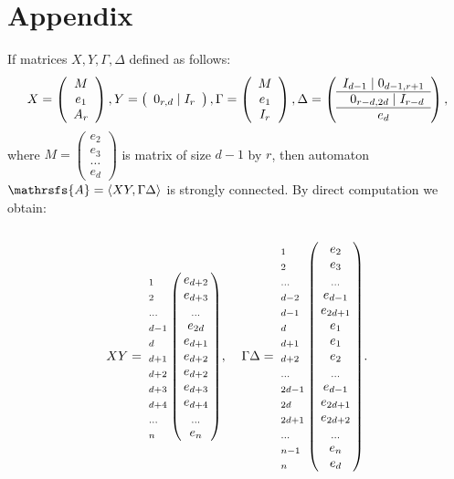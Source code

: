 \documentclass[11pt]{llncs}
\newcommand{\A}{\mathrsfs{A}}
\newcommand{\G}{\Gamma}
\newcommand{\D}{\Delta}
\begin{document}
\section*{Appendix}
If matrices $X,Y,\G,\D$ defined as follows:
$$
X =
\left(
\begin{array}{c}
M \\
e_1 \\
A_r
\end{array}
\right),
Y =
\left(
\begin{array}{c}
0_{r,d} \mid I_r
\end{array}
\right),
\G =
\left(
\begin{array}{c}
M \\
e_1 \\
I_r
\end{array}
\right),
\D =
\left(
\begin{array}{c}
I_{d - 1} \mid 0_{d-1,r + 1} \\ \hline
\textbf{\,\,\,} 0_{r-d,2d} \mid I_{r - d} \\ \hline
e_d
\end{array}
\right),
$$
where $M =
\left(
\begin{smallmatrix}
e_2\\
e_3\\
\ldots\\
e_d
\end{smallmatrix}\right)$ is matrix of size $d - 1$ by $r$,
then automaton $\A = \langle XY, \G\D\rangle$ is strongly connected. By direct computation we obtain:
$$
XY =
\bordermatrix{    ~  &    ~     \cr
                  _1 & e_{d+2}  \cr
                  _2 & e_{d+3}  \cr
                  _{\ldots} & _{\ldots} \cr
                  _{d - 1} & e_{2d}  \cr
                  _d & e_{d+1}  \cr
                  _{d+1} & e_{d+2}  \cr
                  _{d+2} & e_{d+2}  \cr
                  _{d+3} & e_{d+3}  \cr
                  _{d+4} & e_{d+4}  \cr
                  _{\ldots} & _{\ldots} \cr
                  _{n} & e_{n}  \cr
             }, \;\;\;\;
\G\D =
\bordermatrix{    ~  &    ~     \cr
                  _1 & e_{2}  \cr
                  _2 & e_{3}  \cr
                  _{\ldots} & _{\ldots} \cr
                  _{d - 2} & e_{d - 1}  \cr
                  _{d - 1} & e_{2d + 1}  \cr
                  _d & e_{1}  \cr
                  _{d+1} & e_{1}  \cr
                  _{d+2} & e_{2}  \cr
                  _{\ldots} & _{\ldots} \cr
                  _{2d-1} & e_{d-1}  \cr
                  _{2d} & e_{2d+1}  \cr
                  _{2d+1} & e_{2d+2}  \cr
                  _{\ldots} & _{\ldots} \cr
                  _{n-1} & e_{n}  \cr
                  _{n} & e_{d}  \cr
             }.
$$
\end{document}
